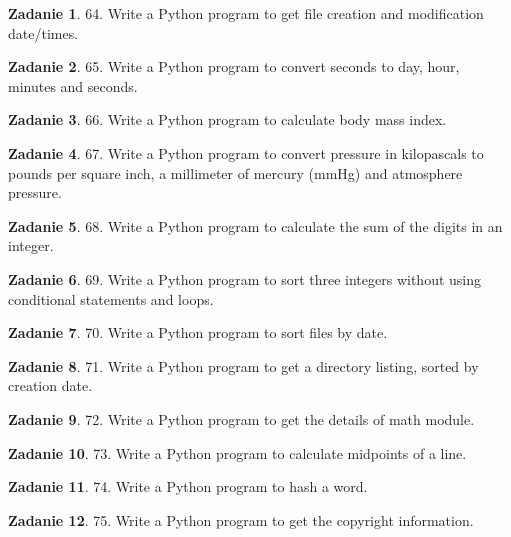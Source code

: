 \documentclass[11pt]{article}
\theoremstyle{definition}
\newtheorem{zadanie}{Zadanie}
\begin{document}
\begin{zadanie}
64. Write a Python program to get file creation and modification date/times.
\end{zadanie}

\begin{zadanie}
65. Write a Python program to convert seconds to day, hour, minutes and seconds.
\end{zadanie}

\begin{zadanie}
66. Write a Python program to calculate body mass index.
\end{zadanie}

\begin{zadanie}
67. Write a Python program to convert pressure in kilopascals to pounds per square inch, a millimeter of mercury (mmHg) and atmosphere pressure.
\end{zadanie}

\begin{zadanie}
68. Write a Python program to calculate the sum of the digits in an integer.
\end{zadanie}

\begin{zadanie}
69. Write a Python program to sort three integers without using conditional statements and loops.
\end{zadanie}

\begin{zadanie}
70. Write a Python program to sort files by date.
\end{zadanie}

\begin{zadanie}
71. Write a Python program to get a directory listing, sorted by creation date.
\end{zadanie}

\begin{zadanie}
72. Write a Python program to get the details of math module.
\end{zadanie}

\begin{zadanie}
73. Write a Python program to calculate midpoints of a line.
\end{zadanie}

\begin{zadanie}
74. Write a Python program to hash a word.
\end{zadanie}

\begin{zadanie}
75. Write a Python program to get the copyright information.
\end{zadanie}
\end{document}
